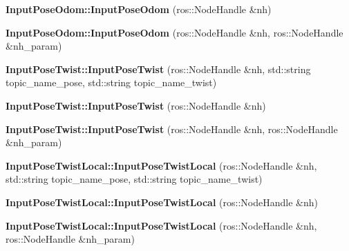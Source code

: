 \begin{DoxyCompactItemize}
\item 
\mbox{\label{group__Input_gaf65f517b5791a223d38d9e08a4c318b5}} 
{\bfseries Input\+Pose\+Odom\+::\+Input\+Pose\+Odom} (ros\+::\+Node\+Handle \&nh)
\item 
\mbox{\label{group__Input_ga178d03771536f57e834e122485d3e73e}} 
{\bfseries Input\+Pose\+Odom\+::\+Input\+Pose\+Odom} (ros\+::\+Node\+Handle \&nh, ros\+::\+Node\+Handle \&nh\+\_\+param)
\item 
\mbox{\label{group__Input_ga81300e68b133bd3df8fabf4d2ea7e4b2}} 
{\bfseries Input\+Pose\+Twist\+::\+Input\+Pose\+Twist} (ros\+::\+Node\+Handle \&nh, std\+::string topic\+\_\+name\+\_\+pose, std\+::string topic\+\_\+name\+\_\+twist)
\item 
\mbox{\label{group__Input_ga118fe4becb20679b5c950827b3b4b449}} 
{\bfseries Input\+Pose\+Twist\+::\+Input\+Pose\+Twist} (ros\+::\+Node\+Handle \&nh)
\item 
\mbox{\label{group__Input_ga0e8c731f5d891db652aabe3d0b6bd92a}} 
{\bfseries Input\+Pose\+Twist\+::\+Input\+Pose\+Twist} (ros\+::\+Node\+Handle \&nh, ros\+::\+Node\+Handle \&nh\+\_\+param)
\item 
\mbox{\label{group__Input_ga613203eb75ab62bb69d211bb41ff09ce}} 
{\bfseries Input\+Pose\+Twist\+Local\+::\+Input\+Pose\+Twist\+Local} (ros\+::\+Node\+Handle \&nh, std\+::string topic\+\_\+name\+\_\+pose, std\+::string topic\+\_\+name\+\_\+twist)
\item 
\mbox{\label{group__Input_ga62a12e3ef3c56dfa955224d66cd21c17}} 
{\bfseries Input\+Pose\+Twist\+Local\+::\+Input\+Pose\+Twist\+Local} (ros\+::\+Node\+Handle \&nh)
\item 
\mbox{\label{group__Input_gac6c272dad9e420c67549b152d4c2581c}} 
{\bfseries Input\+Pose\+Twist\+Local\+::\+Input\+Pose\+Twist\+Local} (ros\+::\+Node\+Handle \&nh, ros\+::\+Node\+Handle \&nh\+\_\+param)
\end{DoxyCompactItemize}
